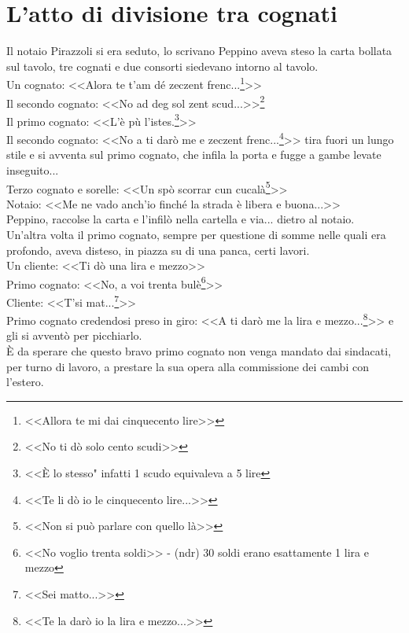 
\chapter{L'atto di divisione tra cognati}
Il notaio Pirazzoli si era seduto, lo scrivano Peppino aveva steso la carta bollata sul tavolo, tre cognati e due consorti siedevano intorno al tavolo. \\
\indent Un cognato: <<Alora te t'am dé zeczent frenc...\footnote{<<Allora te mi dai cinquecento lire>>}>>\\
\indent Il secondo cognato: <<No ad deg sol zent scud...>>\footnote{<<No ti dò solo cento scudi>>}\\
\indent Il primo cognato: <<L'è pù l'istes.\footnote{<<È lo stesso" infatti 1 scudo equivaleva a 5 lire}>>\\
\indent Il secondo cognato: <<No a ti darò me e zeczent frenc...\footnote{<<Te li dò io le cinquecento lire...>>}>> tira fuori un lungo stile e si avventa sul primo cognato, che infila la porta e fugge a gambe levate inseguito...\\
\indent Terzo cognato e sorelle: <<Un spò scorrar cun cucalà\footnote{<<Non si può parlare con quello là>>}>>\\
\indent Notaio: <<Me ne vado anch'io finché la strada è libera e buona...>>\\
Peppino, raccolse la carta e l'infilò nella cartella e via... dietro al notaio.\\

\indent Un'altra volta il primo cognato, sempre per questione di somme nelle quali era profondo, aveva disteso, in piazza su di una panca, certi lavori.\\
\indent Un cliente: <<Ti dò una lira e mezzo>>\\
\indent Primo cognato: <<No, a voi trenta bulè\footnote{<<No voglio trenta soldi>> - (ndr) 30 soldi erano esattamente 1 lira e mezzo}>>\\
\indent Cliente: <<T'si mat...\footnote{<<Sei matto...>>}>>\\
\indent Primo cognato credendosi preso in giro: <<A ti darò me la lira e mezzo...\footnote{<<Te la darò io la lira e mezzo...>>}>> e gli si avventò per picchiarlo.\\
\indent È da sperare che questo bravo primo cognato non venga mandato dai sindacati, per turno di lavoro, a prestare la sua opera alla commissione dei cambi con l'estero.\\
 

